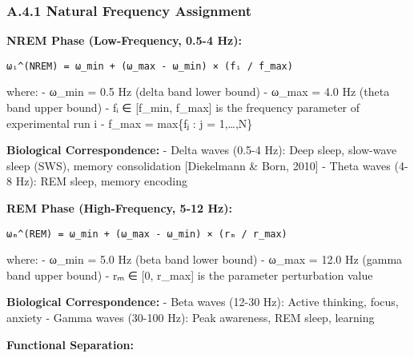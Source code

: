 \documentclass[
]{article}
\begin{document}
\subsubsection{A.4.1 Natural Frequency
Assignment}\label{a.4.1-natural-frequency-assignment}

\textbf{NREM Phase (Low-Frequency, 0.5-4 Hz):}

\begin{verbatim}
ωᵢ^(NREM) = ω_min + (ω_max - ω_min) × (fᵢ / f_max)
\end{verbatim}

where: - ω\_min = 0.5 Hz (delta band lower bound) - ω\_max = 4.0 Hz
(theta band upper bound) - fᵢ ∈ {[}f\_min, f\_max{]} is the frequency
parameter of experimental run i - f\_max = max\{fⱼ : j = 1,\ldots,N\}

\textbf{Biological Correspondence:} - Delta waves (0.5-4 Hz): Deep
sleep, slow-wave sleep (SWS), memory consolidation {[}Diekelmann \&
Born, 2010{]} - Theta waves (4-8 Hz): REM sleep, memory encoding

\textbf{REM Phase (High-Frequency, 5-12 Hz):}

\begin{verbatim}
ωₘ^(REM) = ω_min + (ω_max - ω_min) × (rₘ / r_max)
\end{verbatim}

where: - ω\_min = 5.0 Hz (beta band lower bound) - ω\_max = 12.0 Hz
(gamma band upper bound) - rₘ ∈ {[}0, r\_max{]} is the parameter
perturbation value

\textbf{Biological Correspondence:} - Beta waves (12-30 Hz): Active
thinking, focus, anxiety - Gamma waves (30-100 Hz): Peak awareness, REM
sleep, learning

\textbf{Functional Separation:}
\end{document}
